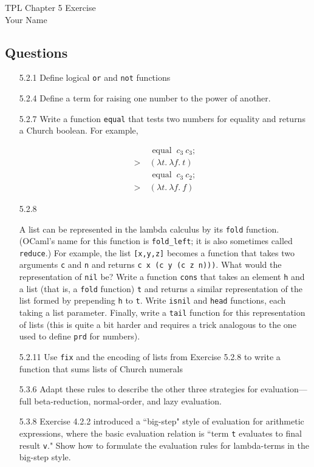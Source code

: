 \documentclass[12pt]{article}
\begin{document}
TPL \hfill Chapter 5 Exercise\\
Your Name

\hrulefill

\subsection*{Questions}

\begin{enumerate}

\item[5.2.1] Define logical \texttt{or} and \texttt{not} functions

\item[5.2.4] Define a term for raising one number to the
power of another.

\item[5.2.7] Write a function \texttt{equal} that tests two numbers for equality and returns a Church boolean. For example,

\begin{align*}
& \text { equal } \ c_3 \ c_3 ; \\
>\ & (\lambda t . \ \lambda f . \ t) \\
& \text { equal } \ c_3 \ c_2 ; \\
>\ & (\lambda t . \ \lambda f . \ f)
\end{align*}

\item[5.2.8]

A list can be represented in the lambda calculus by its \texttt{fold} function. (OCaml's name for this function is \texttt{fold\_left}; it is also sometimes called \texttt{reduce}.) For example, the list \texttt{[x,y,z]} becomes a function that takes two arguments \texttt{c} and \texttt{n} and returns \texttt{c x (c y (c z n)))}. What would the representation of \texttt{nil} be? Write a function \texttt{cons} that takes an element \texttt{h} and a list (that is, a \texttt{fold} function) \texttt{t} and returns a similar representation of the list formed by prepending \texttt{h} to \texttt{t}. Write \texttt{isnil} and \texttt{head} functions, each taking a list parameter. Finally, write a \texttt{tail} function for this representation of lists (this is quite a bit harder and requires a trick analogous to the one used to define \texttt{prd} for numbers).

\item[5.2.11] Use \texttt{fix} and the encoding of lists from Exercise 5.2.8 to write a function that sums lists of Church numerals

\item[5.3.6] Adapt these rules to describe the other three strategies for
evaluation—full beta-reduction, normal-order, and lazy evaluation.

\item[5.3.8] Exercise 4.2.2 introduced a ``big-step" style of evaluation for
arithmetic expressions, where the basic evaluation relation is ``term \texttt{t} evaluates to final result \texttt{v}." Show how to formulate the evaluation rules for lambda-terms in the big-step style.

\end{enumerate}
\end{document}
